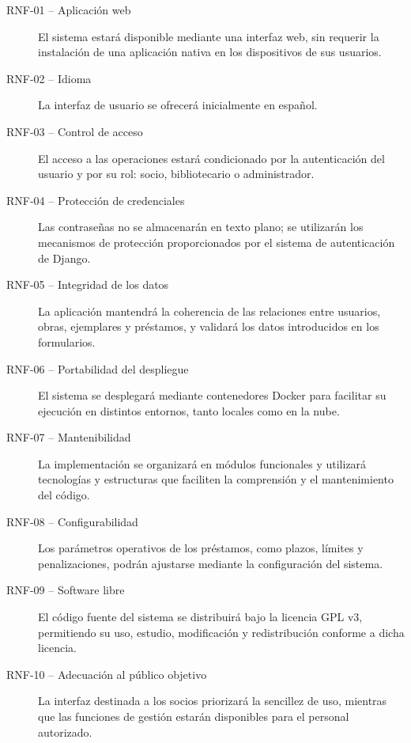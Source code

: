 \begin{description}
	\item[RNF-01 -- Aplicación web]
	El sistema estará disponible mediante una interfaz web, sin requerir la instalación de una aplicación nativa en los dispositivos de sus usuarios.
	
	\item[RNF-02 -- Idioma]
	La interfaz de usuario se ofrecerá inicialmente en español.
	
	\item[RNF-03 -- Control de acceso]
	El acceso a las operaciones estará condicionado por la autenticación del usuario y por su rol: socio, bibliotecario o administrador.
	
	\item[RNF-04 -- Protección de credenciales]
	Las contraseñas no se almacenarán en texto plano; se utilizarán los	mecanismos de protección proporcionados por el sistema de autenticación de Django.
	
	\item[RNF-05 -- Integridad de los datos]
	La aplicación mantendrá la coherencia de las relaciones entre usuarios,	obras, ejemplares y préstamos, y validará los datos introducidos en los formularios.
	
	\item[RNF-06 -- Portabilidad del despliegue]
	El sistema se desplegará mediante contenedores Docker para facilitar su ejecución en distintos entornos, tanto locales como en la nube.
	
	\item[RNF-07 -- Mantenibilidad]
	La implementación se organizará en módulos funcionales y utilizará tecnologías y estructuras que faciliten la comprensión y el mantenimiento del código.
	
	\item[RNF-08 -- Configurabilidad]
	Los parámetros operativos de los préstamos, como plazos, límites y	penalizaciones, podrán ajustarse mediante la configuración del sistema.
	
	\item[RNF-09 -- Software libre]
	El código fuente del sistema se distribuirá bajo la licencia GPL v3, permitiendo su uso, estudio, modificación y redistribución conforme a dicha licencia.
	
	\item[RNF-10 -- Adecuación al público objetivo]
	La interfaz destinada a los socios priorizará la sencillez de uso, mientras que las funciones de gestión estarán disponibles para el	personal autorizado.
\end{description}

